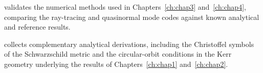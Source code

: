 \begin{leftbarbox}
 validates the numerical methods used in Chapters~\ref{ch:chap3} and~\ref{ch:chap4}, comparing the ray-tracing and quasinormal mode codes against known analytical and reference results.
\end{leftbarbox}

\begin{leftbarbox}
 collects complementary analytical derivations, including the Christoffel symbols of the Schwarzschild metric and the circular-orbit conditions in the Kerr geometry underlying the results of Chapters~\ref{ch:chap1} and~\ref{ch:chap2}.
\end{leftbarbox}

\setlength{\parskip}{0pt}
\setlength{\parindent}{2em}
